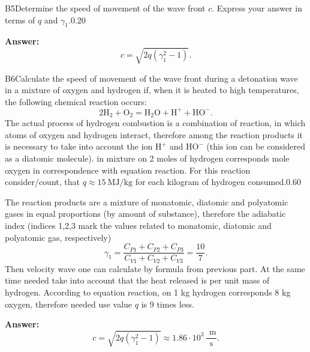 \documentclass[11pt,a4paper]{article}
\begin{document}
\begin{solcard}{B5}{Determine the speed of movement of the wave front $c$. Express your answer in terms of $q$ and $\gamma_1$.}{0.20}
\par\smallskip\noindent\textbf{Answer:} $$ c = \sqrt{2q (\gamma_1^2 -1)}. $$
\end{solcard}

\begin{solcard}{B6}{Calculate the speed of movement of the wave front during a detonation wave in a mixture of oxygen and hydrogen if, when it is heated to high temperatures, the following chemical reaction occurs: $$ 2\mathrm{H}_2+ \mathrm{O} _2 = \mathrm{H}_2 \mathrm{O} + \mathrm{H}^{+} + \mathrm{HO}^{-}. $$The actual process of hydrogen combustion is a combination of reaction, in which atoms of oxygen and hydrogen interact, therefore among the reaction products it is necessary to take into account the ion $\mathrm{H}^{+}$ and $\mathrm{HO}^{-}$ (this ion can be considered as a diatomic molecule). in mixture on 2 moles of hydrogen corresponds mole oxygen in correspondence with equation reaction. For this reaction consider/count, that $q \approx 15~\text{MJ}/\text{kg}$ for each kilogram of hydrogen consumed.}{0.60}

The reaction products are a mixture of monatomic, diatomic and polyatomic gases in equal proportions (by amount of substance), therefore the adiabatic index (indices 1,2,3 mark the values related to monatomic, diatomic and polyatomic gas, respectively) $$ \gamma_1 = \frac{C_{P1} + C_{P2} + C_{P3}}{C_{V1} + C_{V2} + C_{V3}} = \frac{10}{7}. $$Then velocity wave one can calculate by formula from previous part. At the same time needed take into account that the heat released is per unit mass of hydrogen. According to equation reaction, on 1 kg hydrogen corresponds 8 kg oxygen, therefore needed use value $q$ is 9 times less.

\par\smallskip\noindent\textbf{Answer:} $$ c = \sqrt{2 q (\gamma_1^2 - 1)} \approx 1.86 \cdot 10^{3}~\frac{\text{ m}}{\text{s}}. $$
\end{solcard}
\end{document}
